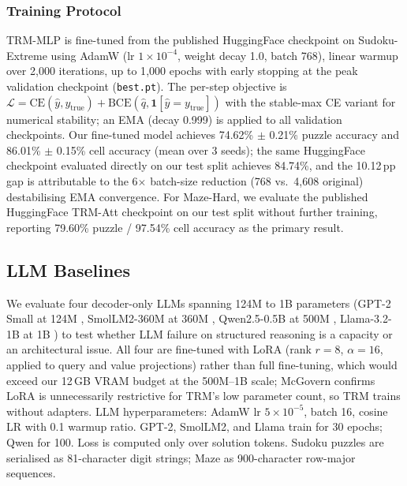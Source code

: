 \documentclass{article}
\begin{document}
\subsubsection{Training Protocol}

TRM-MLP is fine-tuned from the published HuggingFace checkpoint \cite{Sanjin2024Sudoku} on Sudoku-Extreme using AdamW \cite{Loshchilov2017} (lr $1\times10^{-4}$, weight decay 1.0, batch 768), linear warmup over 2{,}000 iterations, up to 1{,}000 epochs with early stopping at the peak validation checkpoint (\texttt{best.pt}). The per-step objective is $\mathcal{L} = \text{CE}(\hat{y}, y_\text{true}) + \text{BCE}(\hat{q}, \mathbf{1}[\hat{y} = y_\text{true}])$ with the stable-max CE variant \cite{Prieto2025} for numerical stability; an EMA (decay 0.999) is applied to all validation checkpoints. Our fine-tuned model achieves 74.62\% $\pm$ 0.21\% puzzle accuracy and 86.01\% $\pm$ 0.15\% cell accuracy (mean over 3 seeds); the same HuggingFace checkpoint evaluated directly on our test split achieves 84.74\%, and the 10.12\,pp gap is attributable to the 6$\times$ batch-size reduction (768 vs.\ 4{,}608 original) destabilising EMA convergence. For Maze-Hard, we evaluate the published HuggingFace TRM-Att checkpoint \cite{Sanjin2024Maze} on our test split without further training, reporting 79.60\% puzzle / 97.54\% cell accuracy as the primary result.

\subsection{LLM Baselines}

We evaluate four decoder-only LLMs spanning 124M to 1B parameters (GPT-2 Small at 124M \cite{Radford2019}, SmolLM2-360M at 360M \cite{Allal2025}, Qwen2.5-0.5B at 500M \cite{Qwen2024}, Llama-3.2-1B at 1B \cite{Dubey2024}) to test whether LLM failure on structured reasoning is a capacity or an architectural issue. All four are fine-tuned with LoRA \cite{Hu2022} (rank $r=8$, $\alpha=16$, applied to query and value projections) rather than full fine-tuning, which would exceed our 12\,GB VRAM budget at the 500M--1B scale; McGovern  confirms LoRA is unnecessarily restrictive for TRM's low parameter count, so TRM trains without adapters. LLM hyperparameters: AdamW lr $5\times10^{-5}$, batch 16, cosine LR with 0.1 warmup ratio. GPT-2, SmolLM2, and Llama train for 30 epochs; Qwen for 100. Loss is computed only over solution tokens. Sudoku puzzles are serialised as 81-character digit strings; Maze as 900-character row-major sequences.
\end{document}
